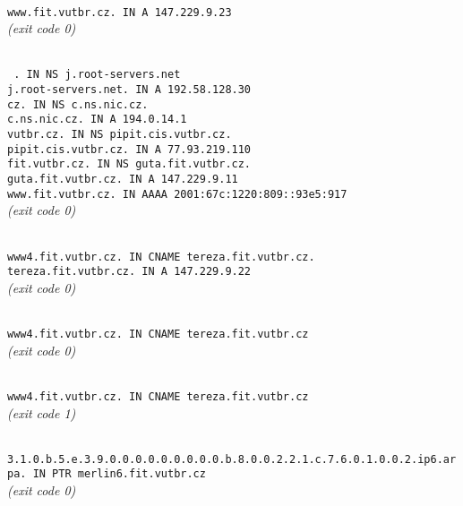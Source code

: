 \documentclass[11pt, a4paper, titlepage]{article}
\begin{document}
\begin{framed}
	 \\
	\texttt{www.fit.vutbr.cz. IN A 147.229.9.23} \\
	\textit{(exit code 0)}
\end{framed}

\begin{framed}
	 \\
	\texttt{ . IN NS j.root-servers.net \\
	j.root-servers.net.	IN	A~192.58.128.30 \\
	cz.	IN	NS	c.ns.nic.cz. \\
	c.ns.nic.cz.	IN	A~194.0.14.1 \\
	vutbr.cz.	IN	NS	pipit.cis.vutbr.cz. \\
	pipit.cis.vutbr.cz.	IN	A~77.93.219.110 \\
	fit.vutbr.cz.	IN	NS	guta.fit.vutbr.cz. \\
	guta.fit.vutbr.cz.	IN	A~147.229.9.11 \\
	www.fit.vutbr.cz.	IN	AAAA	2001:67c:1220:809::93e5:917 \\ }
	\textit{(exit code 0)}
\end{framed}

\begin{framed}
	 \\
	\texttt{www4.fit.vutbr.cz.	IN	CNAME	tereza.fit.vutbr.cz. \\
	tereza.fit.vutbr.cz.	IN	A	147.229.9.22 \\ }
	\textit{(exit code 0)}
\end{framed}

\begin{framed}
	 \\
	\texttt{www4.fit.vutbr.cz.	IN	CNAME	tereza.fit.vutbr.cz \\ }
	\textit{(exit code 0)}
\end{framed}

\begin{framed}
	 \\
	\texttt{www4.fit.vutbr.cz. IN CNAME tereza.fit.vutbr.cz \\ }
	\textit{(exit code 1)}
\end{framed}

\begin{framed}
	 \\
	\texttt{3.1.0.b.5.e.3.9.0.0.0.0.0.0.0.0.0.b.8.0.0.2.2.1.c.7.6.0.1.0.0.2.ip6.arpa. IN PTR merlin6.fit.vutbr.cz \\ }
	\textit{(exit code 0)}
\end{framed}
\end{document}
